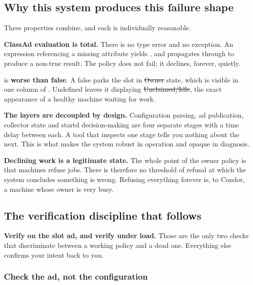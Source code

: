 \subsection{Why this system produces this failure shape}

Three properties combine, and each is individually reasonable.

\textbf{ClassAd evaluation is total.} There is no type error and no exception. An
expression referencing a missing attribute yields , and
 propagates through \kn{\&\&} to produce a non-true result. The
policy does not fail; it declines, forever, quietly.

\begin{trap}
 is \textbf{worse than false}. A false  parks the slot in
\st{Owner} state, which is visible in one column of . Undefined
leaves it displaying \st{Unclaimed/Idle}, the exact appearance of a healthy
machine waiting for work.
\end{trap}

\textbf{The layers are decoupled by design.} Configuration parsing, ad
publication, collector state and startd decision-making are four separate stages
with a time delay between each. A tool that inspects one stage tells you nothing
about the next. This is what makes the system robust in operation and opaque in
diagnosis.

\textbf{Declining work is a legitimate state.} The whole point of the owner
policy is that machines refuse jobs. There is therefore no threshold of refusal
at which the system concludes something is wrong. Refusing everything forever
is, to Condor, a machine whose owner is very busy.

\subsection{The verification discipline that follows}

\begin{keypoint}
\textbf{Verify on the slot ad, and verify under load.} Those are the only two
checks that discriminate between a working policy and a dead one. Everything
else confirms your intent back to you.
\end{keypoint}

\subsubsection{Check the ad, not the configuration}

